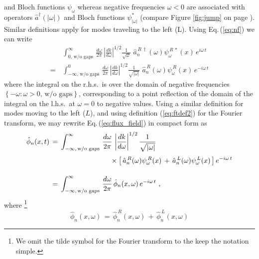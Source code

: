 and Bloch functions $\psi_{\omega}$ whereas negative frequencies $\omega<0$ are associated with
operators $\hat{a}^{\dagger}(|\omega|)$ and Bloch functions $\psi_{|\omega|}^*$
(compare Figure \ref{fig:jump} on page \pageref{fig:jump}).
Similar definitions apply for modes traveling to the left (L).
Using Eq.\,(\ref{eq:nf}) we can write
%
\begin{equation} \label{eq:ccterm}
\begin{split}
   & \int_{0, \, \text{w/o gaps}}^{\infty} \, \frac{d\omega}{2 \pi} \, \left| \frac{d k}{d \omega} \right|^{1/2}
    \frac{1}{\sqrt{\omega}} \, \, 
    \hat{a}_n^{\,R \, \dagger}(\omega) \psi_{\omega}^{\,R \, *}(x) \, e^{i \omega \, t} \\[4mm]
   = \, & \int_{-\infty, \, \text{w/o gaps}}^{0} \, \frac{d\omega}{2 \pi} \, \left| \frac{d k}{d \omega} \right|^{1/2}
    \frac{1}{\sqrt{|\omega|}} \, \, 
    \hat{a}_n^{\,R}(\omega) \psi_{\omega}^{\,R}(x) \, e^{- i \omega \, t}
\end{split}
\end{equation}
%
where the integral on the r.h.s.~is over the domain of negative frequencies
$\left\{ - \omega: \omega > 0, \, \text{w/o gaps} \right\}$, 
corresponding to a point reflection of the domain of the integral on the l.h.s.~at $\omega = 0$ 
to negative values. Using a similar definition for modes moving to the left ($L$), and using 
definition (\ref{eq:ftdef2}) for the Fourier transform, we may 
rewrite Eq.\,(\ref{eq:flux_field}) in compact form as
%
\begin{equation} \label{eq:flux_field2}
\begin{split}
    \hat{\phi}_n(x,t) \, & = \, 
    \displaystyle{
    \int_{-\infty, \, \text{w/o gaps}}^{\infty} \, \frac{d\omega}{2 \pi} \, \left| \frac{d k}{d \omega} \right|^{1/2}
        \frac{1}{\sqrt{|\omega|}}} \\[1mm]
    & \hspace{30mm} \times \left[ \, \hat{a}_n^{\,R}(\omega) \psi_{\omega}^{\,R}(x) \, + \, 
      \hat{a}_n^{\,L}(\omega) \psi_{\omega}^{\,L}(x)  \, \right] e^{-i \omega \, t} \\[4mm]
 & = \,  \int_{-\infty, \, \text{w/o gaps}}^{\infty} \, \frac{d\omega}{2 \pi} \,
     \hat{\phi}_n(x,\omega) \, e^{-i \omega \, t} \, \, ,
\end{split}
\end{equation}
%
where
%
\footnote{We omit the tilde symbol for the Fourier transform to the keep the notation simple.}
%
\begin{equation} \label{eq:flux_field3}
\hat{\phi}_n(x,\omega) \, = \, \hat{\phi}_n^{\,R}(x,\omega) \, + \, \hat{\phi}_n^{\,L}(x,\omega)
\end{equation}
